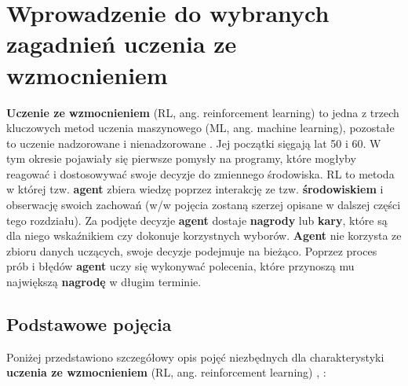 \documentclass{iiuwb}
\begin{document}
\cleardoublepage
\chapter{Wprowadzenie do wybranych zagadnień uczenia ze wzmocnieniem}
\label{cha:Dlaczego LaTeX}

\textbf{Uczenie ze wzmocnieniem} (RL, ang. reinforcement learning) to jedna z trzech kluczowych metod uczenia maszynowego (ML, ang. machine learning), pozostałe to uczenie nadzorowane i nienadzorowane \cite{suttonbarto2018}. Jej początki sięgają lat 50 i 60. W tym okresie pojawiały się pierwsze pomysły na programy, które mogłyby reagować i dostosowywać swoje decyzje do zmiennego środowiska.
RL to metoda w której tzw. \textbf{agent} zbiera wiedzę poprzez interakcję ze tzw. \textbf{środowiskiem} i obserwację swoich zachowań (w/w pojęcia zostaną szerzej opisane w dalszej części tego rozdziału). Za podjęte decyzje \textbf{agent} dostaje \textbf{nagrody} lub \textbf{kary}, które są dla niego wskaźnikiem czy dokonuje korzystnych wyborów. \textbf{Agent} nie korzysta ze zbioru danych uczących, swoje decyzje podejmuje na bieżąco. Poprzez proces prób i błędów \textbf{agent} uczy się wykonywać polecenia, które przynoszą mu największą \textbf{nagrodę} w długim terminie.

\section{Podstawowe pojęcia}
Poniżej przedstawiono szczegółowy opis pojęć niezbędnych dla charakterystyki \textbf{uczenia ze wzmocnieniem} (RL, ang. reinforcement learning) \cite{flowhunt_rl}, \cite{pduch_rl_wyklad}:
\end{document}
